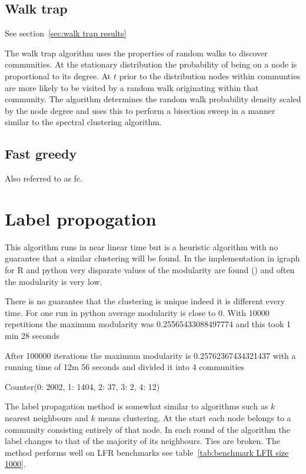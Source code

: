 \subsection{Walk trap}
See section~\ref{sec:walk trap results}

The walk trap algorithm uses the properties of random walks to discover communities. At the stationary distribution the probability of being on a node is proportional to its degree. At $t$ prior to the distribution nodes within communties are more likely to be visited by a random walk originating within that community. The algorithm determines the random walk probability density scaled by the node degree and uses this to perform a bisection sweep in a manner similar to the spectral clustering algorithm.

\cite{pons2005computing}
\subsection{Fast greedy}
Also referred to as fc.
\cite{clauset2004finding}

\section{Label propogation}
\label{sec:label propogation}
This algorithm runs in near linear time but is a heuristic algorithm with no guarantee that a similar clustering will be found. In the implementation in igraph for R and python very disparate values of the modularity are found () and often the modularity is very low. 
\cite{raghavan2007near}

There is no guarantee that the clustering is unique indeed it is different every time. For one run in python average modularity is close to 0. With 10000 repetitions the maximum modularity was 0.25565433088497774 and this took 1 min 28 seconds

After 100000 iterations the maximum modularity is 0.25762367434321437 with a running time of 12m 56 seconds and divided it into 4 communities

Counter(0: 2002, 1: 1404, 2: 37, 3: 2, 4: 12)

The label propagation method is somewhat similar to algorithms such as $k$ nearest neighbours and $k$ means clustering. At the start each node belongs to a community consisting entirely of that node. In each round of the algorithm the label changes to that of the majority of its neighbours. Ties are broken. The method performs well on LFR benchmarks see table~\ref{tab:benchmark LFR size 1000}.


